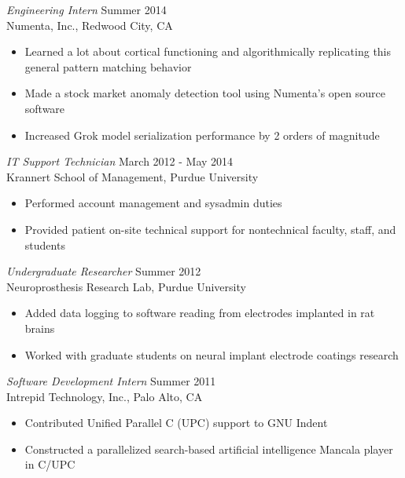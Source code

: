 \documentclass[margin,4pt]{res} %
\begin{document}
\begin{resume}
	
	{\sl Engineering Intern} \hfill Summer 2014\\
          Numenta, Inc., Redwood City, CA
		\begin{itemize} \itemsep -2pt
	   	\item Learned a lot about cortical functioning and algorithmically replicating this general pattern matching behavior
		\item Made a stock market anomaly detection tool using Numenta's open source software
		\item Increased Grok model serialization performance by 2 orders of magnitude
		\end{itemize}

	{\sl IT Support Technician} \hfill March 2012 - May 2014 \\
         	Krannert School of Management, Purdue University
		\begin{itemize} \itemsep -2pt
	      \item Performed account management and sysadmin duties 
           \item Provided patient on-site technical support for nontechnical faculty, staff, and students
		\end{itemize}

	{\sl Undergraduate Researcher} \hfill Summer 2012\\
          Neuroprosthesis Research Lab, Purdue University
	    	\begin{itemize} \itemsep -2pt
	    	\item Added data logging to software reading from electrodes implanted in rat brains
	    	\item Worked with graduate students on neural implant electrode coatings research
	    	\end{itemize}

	{\sl Software Development Intern} \hfill Summer 2011\\
          Intrepid Technology, Inc., Palo Alto, CA
          \begin{itemize}  \itemsep -2pt
		\item Contributed Unified Parallel C (UPC) support to GNU Indent
		\item Constructed a parallelized search-based artificial intelligence Mancala player in C/UPC
		\end{itemize}



\end{resume}
\end{document}
